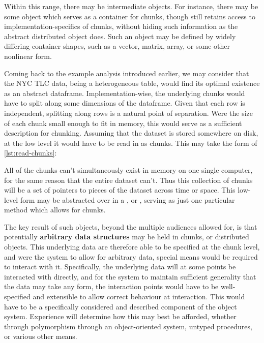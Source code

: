 Within this range, there may be intermediate objects.
For instance, there may be some object which serves as a container for chunks, though still retains access to implementation-specifics of chunks, without hiding such information as the abstract distributed object does.
Such an object may be defined by widely differing container shapes, such as a vector, matrix, array, or some other nonlinear form.

Coming back to the example analysis introduced earlier, we may consider that the NYC TLC data, being a heterogeneous table, would find its optimal existence as an abstract dataframe.
Implementation-wise, the underlying chunks would have to split along some dimensions of the dataframe.
Given that each row is independent, splitting along rows is a natural point of separation.
Were the size of each chunk small enough to fit in memory, this would serve as a sufficient description for chunking.
Assuming that the dataset is stored somewhere on disk, at the low level it would have to be read in as chunks.
This may take the form of \cref{lst:read-chunks}:


All of the chunks can't simultaneously exist in memory on one single computer, for the same reason that the entire dataset can't.
Thus this collection of chunks will be a set of pointers to pieces of the dataset across time or space.
This low-level form may be abstracted over in a , or , serving as just one particular method which allows for chunks.

The key result of such objects, beyond the multiple audiences allowed for, is that potentially \textbf{arbitrary data structures} may be held in chunks, or distributed objects.
This underlying data are therefore able to be specified at the chunk level, and were the system to allow for arbitrary data, special means would be required to interact with it.
Specifically, the underlying data will at some points be interacted with directly, and for the system to maintain sufficient generality that the data may take any form, the interaction points would have to be well-specified and extensible to allow correct behaviour at interaction.
This would have to be a specifically considered and described component of the object system.
Experience will determine how this may best be afforded, whether through polymorphism through an object-oriented system, untyped procedures, or various other means.

